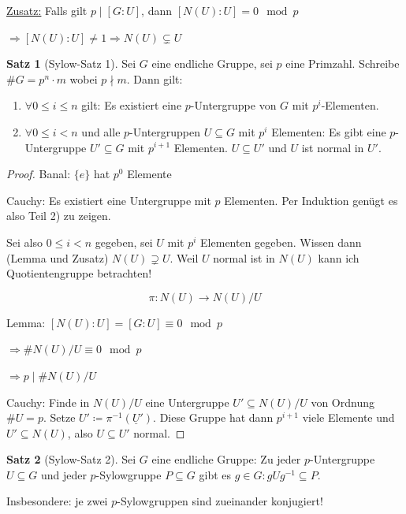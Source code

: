 \documentclass[12pt,parskip=full]{scrartcl}
\newcommand{\heading}{\underline}
\theoremstyle{definition}
\newtheorem{theorem}{Satz}[section]
\theoremstyle{remark}
\begin{document}
	\heading{Zusatz:} Falls gilt $p \mid [G:U]$, dann $[N(U):U] = 0 \mod p$
	
	$\Rightarrow [N(U):U] \neq 1 \Rightarrow N(U) \subsetneq U$
	
	\begin{theorem}[Sylow-Satz 1]
		Sei $G$ eine endliche Gruppe, sei $p$ eine Primzahl. Schreibe $\#G = p^n \cdot m$ wobei $p \nmid m$. Dann gilt:
		\begin{enumerate}
			\item $\forall 0 \leq i \leq n$ gilt: Es existiert eine $p$-Untergruppe von $G$ mit $p^i$-Elementen.
			\item $\forall 0 \leq i < n$ und alle $p$-Untergruppen $U \subseteq G$ mit $p^i$ Elementen: Es gibt eine $p$-Untergruppe $U' \subseteq G$ mit $p^{i+1}$ Elementen. $U \subseteq U'$ und $U$ ist normal in $U'$.
		\end{enumerate}
	\end{theorem}

	\begin{proof}
		Banal: $\{ e \}$ hat $p^0$ Elemente
		
		Cauchy: Es existiert eine Untergruppe mit $p$ Elementen. Per Induktion genügt es also Teil 2) zu zeigen.
		
		Sei also $0 \leq i < n$ gegeben, sei $U$ mit $p^i$ Elementen gegeben. Wissen dann (Lemma und Zusatz) $N(U) \supsetneq U$. Weil $U$ normal ist in $N(U)$ kann ich Quotientengruppe betrachten!
		
		\begin{equation*}
			\pi: N(U) \longrightarrow N(U) / U
		\end{equation*}
		
		Lemma: $[N(U):U] = [G: U] \equiv 0 \mod p$
		
		$\Rightarrow \# N(U)/U \equiv 0 \mod p$
		
		$\Rightarrow p \mid \# N(U)/U$
		
		Cauchy: Finde in $N(U)/U$ eine Untergruppe $U' \subseteq N(U)/U$ von Ordnung $\#U = p$. Setze $U' \coloneqq \pi^{-1} (\underline{U}')$. Diese Gruppe hat dann $p^{i+1}$ viele Elemente und $U' \subseteq N(U)$, also $U \subseteq U'$ normal.
	\end{proof}

	\begin{theorem}[Sylow-Satz 2]
		Sei $G$ eine endliche Gruppe: Zu jeder $p$-Untergruppe $U \subseteq G$ und jeder $p$-Sylowgruppe $P \subseteq G$ gibt es $g \in G: g U g^{-1} \subseteq P$.
		
		Insbesondere: je zwei $p$-Sylowgruppen sind zueinander konjugiert!
	\end{theorem}
\end{document}
